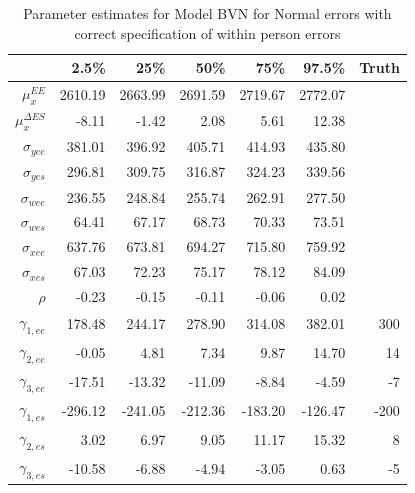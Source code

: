 \documentclass[11pt]{article}\usepackage[]{graphicx}\usepackage[]{color}
\begin{document}
\begin{table}[ht]
\centering
\begin{tabular}{rrrrrr|r}
  \hline
 & 2.5\% & 25\% & 50\% & 75\% & 97.5\% & Truth\\
  \hline
$\mu_x^{EE}$ & 2610.19 & 2663.99 & 2691.59 & 2719.67 & 2772.07 \\ 
  $\mu_x^{\Delta ES}$ & -8.11 & -1.42 & 2.08 & 5.61 & 12.38 \\ 
  $\sigma_{yee}$ & 381.01 & 396.92 & 405.71 & 414.93 & 435.80 \\ 
  $\sigma_{yes}$ & 296.81 & 309.75 & 316.87 & 324.23 & 339.56 \\ 
  $\sigma_{wee}$ & 236.55 & 248.84 & 255.74 & 262.91 & 277.50 \\ 
  $\sigma_{wes}$ & 64.41 & 67.17 & 68.73 & 70.33 & 73.51 \\ 
  $\sigma_{xee}$ & 637.76 & 673.81 & 694.27 & 715.80 & 759.92 \\ 
  $\sigma_{xes}$ & 67.03 & 72.23 & 75.17 & 78.12 & 84.09 \\ 
  $\rho$ & -0.23 & -0.15 & -0.11 & -0.06 & 0.02 \\ 
  $\gamma_{1,ee}$ & 178.48 & 244.17 & 278.90 & 314.08 & 382.01 & 300\\ 
  $\gamma_{2,ee}$ & -0.05 & 4.81 & 7.34 & 9.87 & 14.70 & 14\\ 
  $\gamma_{3,ee}$ & -17.51 & -13.32 & -11.09 & -8.84 & -4.59 & -7\\ 
  $\gamma_{1,es}$ & -296.12 & -241.05 & -212.36 & -183.20 & -126.47 & -200 \\ 
  $\gamma_{2,es}$ & 3.02 & 6.97 & 9.05 & 11.17 & 15.32 & 8\\ 
  $\gamma_{3,es}$ & -10.58 & -6.88 & -4.94 & -3.05 & 0.63 & -5\\ 
  \hline
\end{tabular}
\caption{Parameter estimates for Model BVN for Normal errors with correct specification of within person errors}
\label{mbvnwpestimates}
\end{table}
\end{document}

